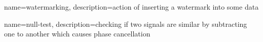 {
  name=watermarking,
  description={action of inserting a watermark into some data}
}

{
  name={null-test},
  description={checking if two signals are similar by subtracting one to another which causes phase cancellation}
}